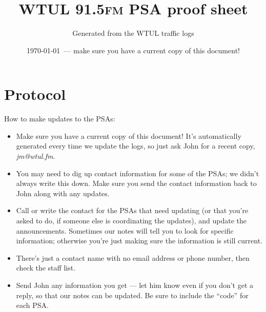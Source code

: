 \documentclass [11pt]{article}
\begin{document}
\title {WTUL 91.5\textsc {fm} PSA proof sheet}
\author {Generated from the WTUL traffic logs}
\date {\today \ --- make sure you have a current copy of this document!}
\maketitle 
\section {Protocol}
How to make updates to the PSAs:
\begin {itemize}
\item Make sure you have a current copy of this document! It's automatically generated every time we update the logs, so just ask John for a recent copy, \textsl {jm@wtul.fm}\enspace .
\item You may need to dig up contact information for some of the PSAs; we didn't always write this down. Make sure you send the contact information back to John along with any updates.
\item Call or write the contact for the PSAs that need updating (or that you're asked to do, if someone else is coordinating the updates), and update the announcements. Sometimes our notes will tell you to look for specific information; otherwise you're just making sure the information is still current.
\item There's just a contact name with no email address or phone number, then check the staff list.
\item Send John any information you get --- let him know even if you don't get a reply, so that our notes can be updated. Be sure to include the ``code'' for each PSA.
\end {itemize}
\end{document}
